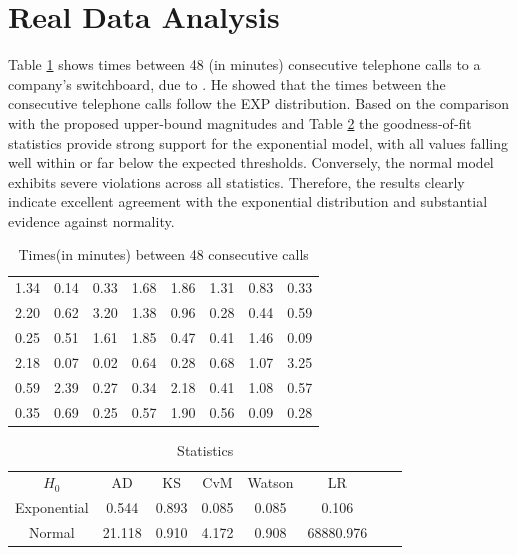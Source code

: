 \documentclass[twoside]{article}
\begin{document}
\section{Real Data Analysis}
Table \ref{data} shows times between 48 (in minutes) consecutive telephone calls to a company’s switchboard, due to \cite{Castillo2005}. He showed  that the times between
the consecutive telephone calls follow the EXP distribution. Based on the comparison with the proposed upper‑bound magnitudes and Table \ref{stat} the goodness‑of‑fit statistics provide strong support for the exponential model, with all values falling well within or far below the expected thresholds. Conversely, the normal model exhibits severe violations across all statistics. Therefore, the results clearly indicate excellent agreement with the exponential distribution and substantial evidence against normality.
\begin{table}[H]
	\centering
	\caption{Times(in minutes) between 48 consecutive calls} 
	\begin{tabular}{cccccccc}
		\hline
 1.34&0.14&0.33&1.68&1.86&1.31&0.83&0.33\\
2.20&0.62&3.20&1.38&0.96&0.28&0.44&0.59\\
0.25&0.51&1.61&1.85&0.47&0.41&1.46&0.09\\
2.18&0.07&0.02&0.64&0.28&0.68&1.07&3.25\\
0.59&2.39&0.27&0.34&2.18&0.41&1.08&0.57\\
0.35&0.69&0.25&0.57&1.90&0.56&0.09&0.28\\ \hline
\end{tabular}\label{data}
\end{table}
\begin{table}[H]
	\centering
	\caption{Statistics} 
	\begin{tabular}{cccccccc}
		\hline
       $H_0$    &AD & KS&CvM&Watson &LR \\
Exponential& 0.544 & 0.893 & 0.085 & 0.085 & 0.106 \\
Normal& 21.118 &    0.910& 4.172 & 0.908&68880.976 \\ 
\hline
\end{tabular}\label{stat}
\end{table}
\end{document}
